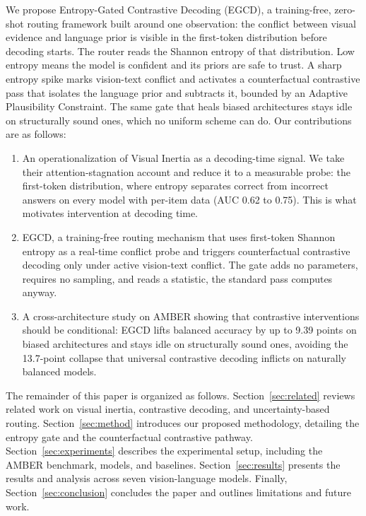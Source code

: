 \documentclass[pdflatex,sn-basic,Numbered]{sn-jnl}
\theoremstyle{thmstyleone}
\theoremstyle{thmstyletwo}
\theoremstyle{thmstylethree}
\begin{document}
We propose Entropy-Gated Contrastive Decoding (EGCD), a training-free, zero-shot routing framework built around one observation: the conflict between visual evidence and language prior is visible in the first-token distribution before decoding starts. The router reads the Shannon entropy of that distribution. Low entropy means the model is confident and its priors are safe to trust. A sharp entropy spike marks vision-text conflict and activates a counterfactual contrastive pass that isolates the language prior and subtracts it, bounded by an Adaptive Plausibility Constraint. The same gate that heals biased architectures stays idle on structurally sound ones, which no uniform scheme can do. Our contributions are as follows:

\begin{enumerate}
\item An operationalization of Visual Inertia \cite{gong2026attention} as a decoding-time signal. We take their attention-stagnation account and reduce it to a measurable probe: the first-token distribution, where entropy separates correct from incorrect answers on every model with per-item data (AUC 0.62 to 0.75). This is what motivates intervention at decoding time.

\item EGCD, a training-free routing mechanism that uses first-token Shannon entropy as a real-time conflict probe and triggers counterfactual contrastive decoding only under active vision-text conflict. The gate adds no parameters, requires no sampling, and reads a statistic, the standard pass computes anyway.

\item A cross-architecture study on AMBER showing that contrastive interventions should be conditional: EGCD lifts balanced accuracy by up to 9.39 points on biased architectures and stays idle on structurally sound ones, avoiding the 13.7-point collapse that universal contrastive decoding inflicts on naturally balanced models.
\end{enumerate}

The remainder of this paper is organized as follows. Section~\ref{sec:related} reviews related work on visual inertia, contrastive decoding, and uncertainty-based routing. Section~\ref{sec:method} introduces our proposed methodology, detailing the entropy gate and the counterfactual contrastive pathway. Section~\ref{sec:experiments} describes the experimental setup, including the AMBER benchmark, models, and baselines. Section~\ref{sec:results} presents the results and analysis across seven vision-language models. Finally, Section~\ref{sec:conclusion} concludes the paper and outlines limitations and future work.
\end{document}
